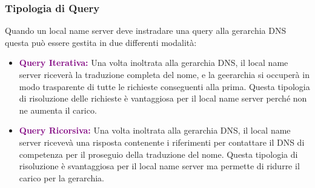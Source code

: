 \subsubsection{Tipologia di Query} Quando un local name server deve instradare una query alla gerarchia DNS questa può essere gestita in due differenti modalità:
\begin{itemize}
    \item \textbf{\textcolor{purple}{Query Iterativa:}} Una volta inoltrata alla gerarchia DNS, il local name server riceverà la traduzione completa del nome, e la geerarchia si occuperà in modo trasparente di tutte le richieste conseguenti alla prima. Questa tipologia di risoluzione delle richieste è vantaggiosa per il local name server perché non ne aumenta il carico.
    \item \textbf{\textcolor{purple}{Query Ricorsiva:}} Una volta inoltrata alla gerarchia DNS, il local name server ricevevà una risposta contenente i riferimenti per contattare il DNS di competenza per il proseguio della traduzione del nome. Questa tipologia di risoluzione è svantaggiosa per il local name server ma permette di ridurre il carico per la gerarchia.
\end{itemize}
